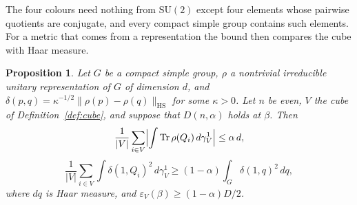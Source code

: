 \documentclass[11pt]{amsart}
\newtheorem{proposition}[theorem]{Proposition}
\theoremstyle{definition}
\theoremstyle{remark}
\numberwithin{equation}{section}
\newcommand{\SU}{\mathrm{SU}}
\newcommand{\Tr}{\operatorname{Tr}}
\begin{document}
The four colours need nothing from $\SU(2)$ except four elements whose
pairwise quotients are conjugate, and every compact simple group contains
such elements. For a metric that comes from a representation the bound then
compares the cube with Haar measure.

\begin{proposition}\label{prop:fourcolours}
Let $G$ be a compact simple group, $\rho$ a nontrivial irreducible unitary
representation of $G$ of dimension $d$, and $\delta(p,q)=\kappa^{-1/2}\|\rho(p)
-\rho(q)\|_{\mathrm{HS}}$ for some $\kappa>0$. Let $n$ be even, $V$ the cube of
Definition~\ref{def:cube}, and suppose that $D(n,\alpha)$ holds at $\beta$.
Then
\[
\frac1{|V|}\sum_{i\in V}\Bigl|\int\Tr\rho(Q_i)\,d\gamma^1_V\Bigr|\le
\alpha\,d,
\]
\[
\frac1{|V|}\sum_{i\in V}\int\delta(1,Q_i)^2\,d\gamma^1_V\ge(1-\alpha)
\int_G\delta(1,q)^2\,dq ,
\]
where $dq$ is Haar measure, and $\varepsilon_V(\beta)\ge(1-\alpha)D/2$.
\end{proposition}
\end{document}
